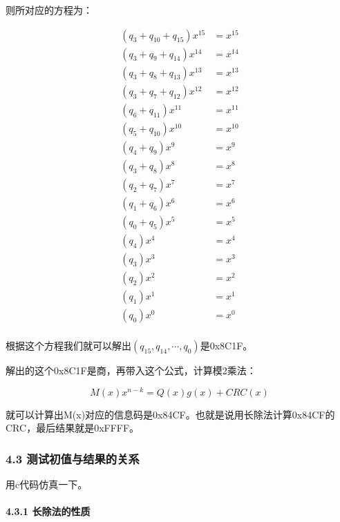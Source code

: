 \documentclass[
]{article}
\begin{document}
则所对应的方程为：

\begin{equation}
\begin{aligned}
(q_{3}+q_{10}+q_{15})x^{15}&=x^{15}\\
(q_{3}+q_{ 9}+q_{14})x^{14}&=x^{14}\\
(q_{3}+q_{ 8}+q_{13})x^{13}&=x^{13}\\
(q_{3}+q_{ 7}+q_{12})x^{12}&=x^{12}\\
(      q_{ 6}+q_{11})x^{11}&=x^{11}\\
(      q_{ 5}+q_{10})x^{10}&=x^{10}\\
(      q_{ 4}+q_{ 9})x^{ 9}&=x^{ 9}\\
(      q_{ 3}+q_{ 8})x^{ 8}&=x^{ 8}\\
(      q_{ 2}+q_{ 7})x^{ 7}&=x^{ 7}\\
(      q_{ 1}+q_{ 6})x^{ 6}&=x^{ 6}\\
(      q_{ 0}+q_{ 5})x^{ 5}&=x^{ 5}\\
(             q_{ 4})x^{ 4}&=x^{ 4}\\
(             q_{ 3})x^{ 3}&=x^{ 3}\\
(             q_{ 2})x^{ 2}&=x^{ 2}\\
(             q_{ 1})x^{ 1}&=x^{ 1}\\
(             q_{ 0})x^{ 0}&=x^{ 0}\\
\end{aligned}
\end{equation}

根据这个方程我们就可以解出$(q_{15},q_{14},\cdots,q_0)$是0x8C1F。

解出的这个0x8C1F是商，再带入这个公式，计算模2乘法：

\begin{equation}
M(x)x^{n-k}=Q(x)g(x)+CRC(x)
\end{equation}

就可以计算出M(x)对应的信息码是0x84CF。也就是说用长除法计算0x84CF的CRC，最后结果就是0xFFFF。

\hypertarget{header-n220}{%
\subsubsection{4.3 测试初值与结果的关系}\label{header-n220}}

用c代码仿真一下。

\paragraph{4.3.1 长除法的性质}
\end{document}
